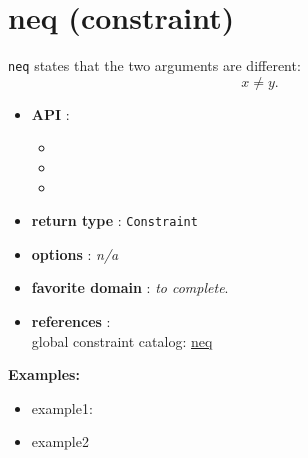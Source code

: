 \label{neq}
\hypertarget{neq}{}

\section{neq (constraint)}\label{neq:neqconstraint}\hypertarget{neq:neqconstraint}{}

\begin{notedef}
  \texttt{neq} states that the two arguments are different:
$$x \neq y.$$
\end{notedef}
\begin{itemize}
	\item \textbf{API} :
	\begin{itemize}
		\item {}
		\item {}
		\item {}
	\end{itemize}
	\item \textbf{return type} : \texttt{Constraint}
	\item \textbf{options} : \emph{n/a}
	\item \textbf{favorite domain} : \emph{to complete}.
	\item \textbf{references} :\\
      global constraint catalog: \href{http://www.emn.fr/x-info/sdemasse/gccat/Cneq.html}{neq}
\end{itemize}

\textbf{Examples:}
\begin{itemize}
	\item example1:
\end{itemize}



\begin{itemize}
	\item example2
\end{itemize}

